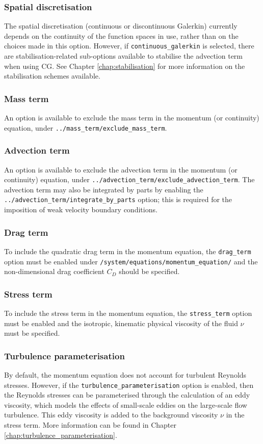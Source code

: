 \documentclass[a4paper,11pt]{report}
\begin{document}
\subsubsection{Spatial discretisation}
The spatial discretisation (continuous or discontinuous Galerkin) currently depends on the continuity of the function spaces in use, rather than on the choices made in this option. However, if \texttt{continuous\_galerkin} is selected, there are stabilisation-related sub-options available to stabilise the advection term when using CG. See Chapter \ref{chap:stabilisation} for more information on the stabilisation schemes available.

\subsubsection{Mass term}
An option is available to exclude the mass term in the momentum (or continuity) equation, under \texttt{../mass\_term/exclude\_mass\_term}.

\subsubsection{Advection term}
An option is available to exclude the advection term in the momentum (or continuity) equation, under \texttt{../advection\_term/exclude\_advection\_term}. The advection term may also be integrated by parts by enabling the \texttt{../advection\_term/integrate\_by\_parts} option; this is required for the imposition of weak velocity boundary conditions.

\subsubsection{Drag term}
To include the quadratic drag term in the momentum equation, the \texttt{drag\_term} option must be enabled under \texttt{/system/equations/momentum\_equation/} and the non-dimensional drag coefficient $C_D$ should be specified.

\subsubsection{Stress term}
To include the stress term in the momentum equation, the \texttt{stress\_term} option must be enabled and the isotropic, kinematic physical viscosity of the fluid $\nu$ must be specified.

\subsubsection{Turbulence parameterisation}
By default, the momentum equation does not account for turbulent Reynolds stresses. However, if the \texttt{turbulence\_parameterisation} option is enabled, then the Reynolds stresses can be parameterised through the calculation of an eddy viscosity, which models the effects of small-scale eddies on the large-scale flow turbulence. This eddy viscosity is added to the background viscosity $\nu$ in the stress term. More information can be found in Chapter \ref{chap:turbulence_parameterisation}.
\end{document}

